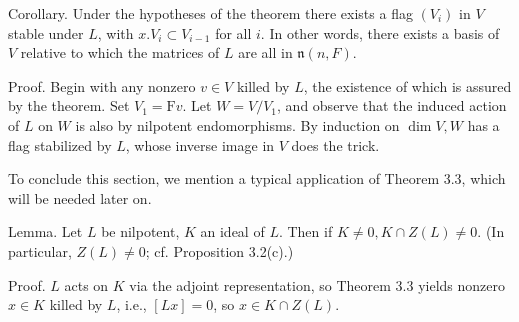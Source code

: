 \documentclass[10pt]{article}
\begin{document}
Corollary. Under the hypotheses of the theorem there exists a flag $\left(V_{i}\right)$ in $V$ stable under $L$, with $x . V_{i} \subset V_{i-1}$ for all $i$. In other words, there exists a basis of $V$ relative to which the matrices of $L$ are all in $\mathfrak{n}(n, F)$.

Proof. Begin with any nonzero $v \in V$ killed by $L$, the existence of which is assured by the theorem. Set $V_{1}=\mathrm{F} v$. Let $W=V / V_{1}$, and observe that the induced action of $L$ on $W$ is also by nilpotent endomorphisms. By induction on $\operatorname{dim} V, W$ has a flag stabilized by $L$, whose inverse image in $V$ does the trick.

To conclude this section, we mention a typical application of Theorem 3.3, which will be needed later on.

Lemma. Let $L$ be nilpotent, $K$ an ideal of $L$. Then if $K \neq 0, K \cap Z(L) \neq 0$. (In particular, $Z(L) \neq 0$; cf. Proposition 3.2(c).)

Proof. $L$ acts on $K$ via the adjoint representation, so Theorem 3.3 yields nonzero $x \in K$ killed by $L$, i.e., $[L x]=0$, so $x \in K \cap Z(L)$.
\end{document}
